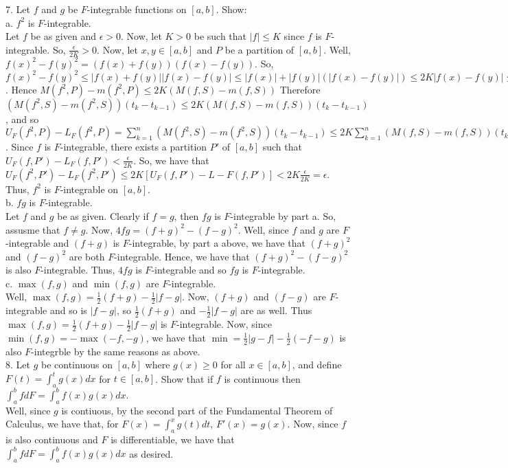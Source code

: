 \documentclass[12pt]{article}
\begin{document}
7. Let $f$ and $g$ be $F$-integrable functions on $[a,b]$. Show:\\
a. $f^2$ is $F$-integrable.\\
Let $f$ be as given and $\epsilon>0$. Now, let $K>0$ be such that $|f|\leq K$ since $f$ is $F$-integrable. So, $\frac{\epsilon}{2K}>0$. Now, let $x,y\in[a,b]$ and $P$ be a partition of $[a,b]$. Well, $f(x)^2-f(y)^2=(f(x)+f(y))(f(x)-f(y))$. So, $f(x)^2-f(y)^2\leq|f(x)+f(y)||f(x)-f(y)|\leq|f(x)|+|f(y)|(|f(x)-f(y)|)\leq2K|f(x)-f(y)|\leq2K(M(f,S)-m(f,S))$. Hence $M(f^2,P)-m(f^2,P)\leq 2K(M(f,S)-m(f,S))$ Therefore $(M(f^2,S)-m(f^2,S))(t_k-t_{k-1})\leq2K(M(f,S)-m(f,S))(t_k-t_{k-1})$, and so $U_F(f^2,P)-L_F(f^2,P)=\sum_{k=1}^n(M(f^2,S)-m(f^2,S))(t_k-t_{k-1})\leq2K\sum_{k=1}^n(M(f,S)-m(f,S))(t_k-t_{k-1})=2K[U_F(f,P)-L_F(f,P)]$. Since $f$ is $F$-integrable, there exists a partition $P'$ of $[a,b]$ such that $U_F(f,P')-L_F(f,P')<\frac{\epsilon}{2K}$. So, we have that $U_F(f^2,P')-L_F(f^2,P')\leq2K[U_F(f,P')-L-F(f,P')]<2K\frac{\epsilon}{2K}=\epsilon$. Thus, $f^2$ is $F$-integrable on $[a,b]$.\\
b. $fg$ is $F$-integrable.\\
Let $f$ and $g$ be as given. Clearly if $f=g$, then $fg$ is $F$-integrable by part a. So, assusme that $f\neq g$. Now, $4fg=(f+g)^2-(f-g)^2$. Well, since $f$ and $g$ are $F$-integrable and $(f+g)$ is $F$-integrable, by part a above, we have that $(f+g)^2$ and $(f-g)^2$ are both $F$-integrable. Hence, we have that $(f+g)^2-(f-g)^2$ is also $F$-integrable. Thus, $4fg$ is $F$-integrable and so $fg$ is $F$-integrable.\\
c. $\max(f,g)$ and $\min(f,g)$ are $F$-integrable.\\
Well, $\max(f,g)=\frac12(f+g)-\frac12|f-g|$. Now, $(f+g)$ and $(f-g)$ are $F$-integrable and so is $|f-g|$, so $\frac12(f+g)$ and $-\frac12|f-g|$ are as well. Thus $\max(f,g)=\frac12(f+g)-\frac12|f-g|$ is $F$-integrable. Now, since $\min(f,g)=-\max(-f,-g)$, we have that $\min=\frac12|g-f|-\frac12(-f-g)$ is also $F$-integrble by the same reasons as above.\\[20pt]

8. Let $g$ be continuous on $[a,b]$ where $g(x)\geq0$ for all $x\in[a,b]$, and define $F(t)=\int_a^tg(x)dx$ for $t\in[a,b]$. Show that if $f$ is continuous then $\int_a^bfdF=\int_a^bf(x)g(x)dx$.\\
Well, since $g$ is contiuous, by the second part of the Fundamental Theorem of Calculus, we have that, for $F(x)=\int_a^xg(t)dt$, $F'(x)=g(x)$. Now, since $f$ is also continuous and $F$ is differentiable, we have that $\int_a^bfdF=\int_a^bf(x)g(x)dx$ as desired.\\[20pt]
\end{document}
